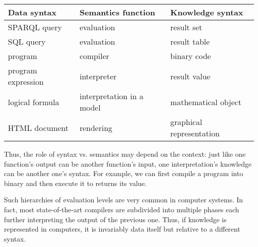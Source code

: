 \begin{center}
\begin{tabular}{l|l|l}
Data syntax & Semantics function & Knowledge syntax \\
\hline
SPARQL query & evaluation & result set \\
SQL query & evaluation & result table \\
program & compiler & binary code \\
program expression & interpreter & result value \\ 
logical formula & interpretation in a model & mathematical object \\
HTML document & rendering & graphical representation 
\end{tabular}
\end{center}

Thus, the role of syntax vs. semantics may depend on the context: just like one function's output can be another function's input, one interpretation's knowledge can be another one's syntax.
For example, we can first compile a program into binary and then execute it to returns its value.

Such hierarchies of evaluation levels are very common in computer systems.
In fact, most state-of-the-art compilers are subdivided into multiple phases each further interpreting the output of the previous one.
Thus, if knowledge is represented in computers, it is invariably data itself but relative to a different syntax.